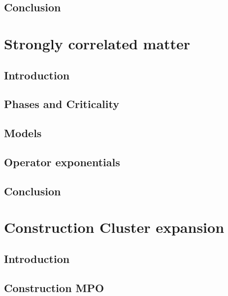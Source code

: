 \documentclass{book}
\newcounter{a}
\newcounter{b}
\begin{document}


\section{Conclusion}


\chapter{Strongly correlated matter}\label{chap3}

\section{Introduction}


\section{Phases and Criticality} \label{sec:PhasesAndCrit}


\section{Models}


\section{Operator exponentials}


\section{Conclusion}


\chapter{Construction Cluster expansion} \label{chap4}

\section{Introduction}


\section{Construction MPO}\label{H4_mpo_cons}

\end{document}
